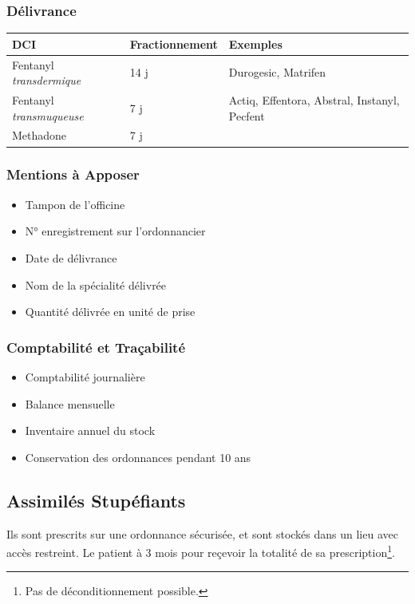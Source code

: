 \documentclass[11pt]{article}
\begin{document}
\subsubsection{Délivrance}
\label{sec:org2c03132}
\begin{center}
\begin{tabular}{lll}
DCI & Fractionnement & Exemples\\
\hline
Fentanyl \emph{transdermique} & 14 j & Durogesic, Matrifen\\
Fentanyl \emph{transmuqueuse} & 7 j & Actiq, Effentora, Abstral, Instanyl, Pecfent\\
Methadone & 7 j & \\
\end{tabular}
\end{center}

\subsubsection{Mentions à Apposer}
\label{sec:org2ae19c8}
\begin{itemize}
\item Tampon de l'officine
\item N° enregistrement sur l'ordonnancier
\item Date de délivrance
\item Nom de la spécialité délivrée
\item Quantité délivrée en unité de prise
\end{itemize}

\subsubsection{Comptabilité et Traçabilité}
\label{sec:org86ffab3}
\begin{itemize}
\item Comptabilité journalière
\item Balance mensuelle
\item Inventaire annuel du stock
\item Conservation des ordonnances pendant 10 ans
\end{itemize}

\subsection{Assimilés Stupéfiants}
\label{sec:org081a32c}
Ils sont prescrits sur une ordonnance sécurisée, et sont stockés dans un lieu avec accès restreint.
Le patient à 3 mois pour reçevoir la totalité de sa prescription\footnote{Pas de déconditionnement possible.}.
\end{document}

